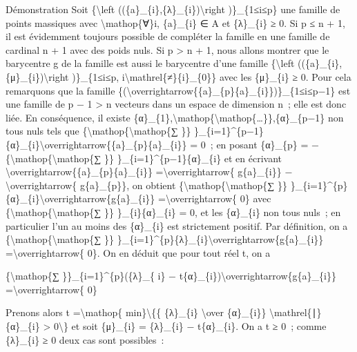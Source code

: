 \documentclass[]{article}
\begin{document}
Démonstration Soit \{\textbackslash{}left
((\{a\}\_\{i\},\{λ\}\_\{i\})\textbackslash{}right )\}\_\{1≤i≤p\} une
famille de points massiques avec \textbackslash{}mathop\{∀\}i,
\{a\}\_\{i\} ∈ A et \{λ\}\_\{i\} ≥ 0. Si p ≤ n + 1, il est évidemment
toujours possible de compléter la famille en une famille de cardinal n +
1 avec des poids nuls. Si p \textgreater{} n + 1, nous allons montrer
que le barycentre g de la famille est aussi le barycentre d'une famille
\{\textbackslash{}left ((\{a\}\_\{i\},\{μ\}\_\{i\})\textbackslash{}right
)\}\_\{1≤i≤p, i\textbackslash{}mathrel\{≠\}\{i\}\_\{0\}\} avec les
\{μ\}\_\{i\} ≥ 0. Pour cela remarquons que la famille
\{(\textbackslash{}overrightarrow\{\{a\}\_\{p\}\{a\}\_\{i\}\})\}\_\{1≤i≤p−1\}
est une famille de p − 1 \textgreater{} n vecteurs dans un espace de
dimension n~; elle est donc liée. En conséquence, il existe
\{α\}\_\{1\},\textbackslash{}mathop\{\textbackslash{}mathop\{\ldots{}\}\},\{α\}\_\{p−1\}
non tous nuls tels que
\{\textbackslash{}mathop\{\textbackslash{}mathop\{∑ \}\}
\}\_\{i=1\}\^{}\{p−1\}\{α\}\_\{i\}\textbackslash{}overrightarrow\{\{a\}\_\{p\}\{a\}\_\{i\}\}
= 0~; en posant \{α\}\_\{p\} =
−\{\textbackslash{}mathop\{\textbackslash{}mathop\{∑ \}\}
\}\_\{i=1\}\^{}\{p−1\}\{α\}\_\{i\} et en écrivant
\textbackslash{}overrightarrow\{\{a\}\_\{p\}\{a\}\_\{i\}\}
=\textbackslash{}overrightarrow\{ g\{a\}\_\{i\}\}
−\textbackslash{}overrightarrow\{ g\{a\}\_\{p\}\}, on obtient
\{\textbackslash{}mathop\{\textbackslash{}mathop\{∑ \}\}
\}\_\{i=1\}\^{}\{p\}\{α\}\_\{i\}\textbackslash{}overrightarrow\{g\{a\}\_\{i\}\}
=\textbackslash{}overrightarrow\{ 0\} avec
\{\textbackslash{}mathop\{\textbackslash{}mathop\{∑ \}\}
\}\_\{i\}\{α\}\_\{i\} = 0, et les \{α\}\_\{i\} non tous nuls~; en
particulier l'un au moins des \{α\}\_\{i\} est strictement positif. Par
définition, on a \{\textbackslash{}mathop\{\textbackslash{}mathop\{∑
\}\}
\}\_\{i=1\}\^{}\{p\}\{λ\}\_\{i\}\textbackslash{}overrightarrow\{g\{a\}\_\{i\}\}
=\textbackslash{}overrightarrow\{ 0\}. On en déduit que pour tout réel
t, on a

\{\textbackslash{}mathop\{∑ \}\}\_\{i=1\}\^{}\{p\}(\{λ\}\_\{ i\} −
t\{α\}\_\{i\})\textbackslash{}overrightarrow\{g\{a\}\_\{i\}\}
=\textbackslash{}overrightarrow\{ 0\}

Prenons alors t =\textbackslash{}mathop\{ min\}\textbackslash{}\{\{
\{λ\}\_\{i\} \textbackslash{}over \{α\}\_\{i\}\}
\textbackslash{}mathrel\{∣\}\{α\}\_\{i\} \textgreater{}
0\textbackslash{}\} et soit \{μ\}\_\{i\} = \{λ\}\_\{i\} − t\{α\}\_\{i\}.
On a t ≥ 0~; comme \{λ\}\_\{i\} ≥ 0 deux cas sont possibles~:
\end{document}
